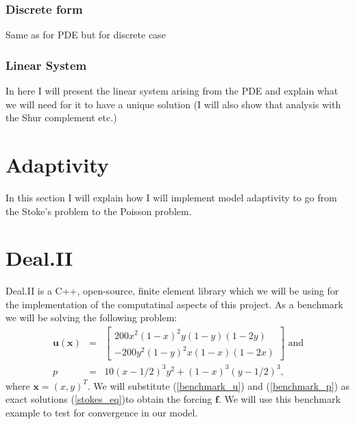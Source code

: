 \documentclass[12pt,a4paper]{article}
\theoremstyle{definition}
\begin{document}
\subsubsection{Discrete form}
Same as for PDE but for discrete case
\subsubsection{Linear System}
In here I will present the linear system arising from the PDE and explain what we will need for it to have a unique solution (I will also show that analysis with the Shur complement etc.)

\section{Adaptivity}
In this section I will explain how I will implement model adaptivity to go from the Stoke's problem to the Poisson problem.

\section{Deal.II}
Deal.II is a C++, open-source, finite element library which we will be using for the implementation of the computatinal aspects of this project.  As a benchmark we will be solving the following problem:
\begin{eqnarray}
\label{benchmark_u}
	\textbf{u}\left(\textbf{x}\right)&=&\begin{bmatrix}
	200x^2\left(1-x\right)^2y\left(1-y\right)\left(1-2y\right)  \\
	-200y^2\left(1-y\right)^2x\left(1-x\right)\left(1-2x\right)  
	\end{bmatrix} \text{ and}\\\label{benchmark_p}
	p &=& 10\left(x-1/2\right)^3y^2+\left(1-x\right)^3\left(y-1/2\right)^3,
\end{eqnarray}
where $\textbf{x}=\left(x,y\right)^T$.    We will substitute (\ref{benchmark_u}) and (\ref{benchmark_p}) as exact solutions (\ref{stokes_eq})to obtain the forcing $\textbf{f}$.  We will use this benchmark example to test for convergence in our model.
\end{document}
